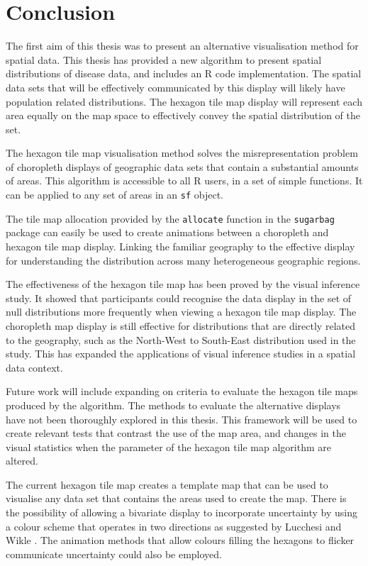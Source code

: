 \documentclass{monashthesis}
\begin{document}
\hypertarget{ch:conclusion}{%
\chapter{Conclusion}\label{ch:conclusion}}

The first aim of this thesis was to present an alternative visualisation method for spatial data. This thesis has provided a new algorithm to present spatial distributions of disease data, and includes an R code \autocite{R} implementation. The spatial data sets that will be effectively communicated by this display will likely have population related distributions. The hexagon tile map display will represent each area equally on the map space to effectively convey the spatial distribution of the set.

The hexagon tile map visualisation method solves the misrepresentation problem of choropleth displays of geographic data sets that contain a substantial amounts of areas. This algorithm is accessible to all R users, in a set of simple functions. It can be applied to any set of areas in an \texttt{sf} \autocite{sf} object.

The tile map allocation provided by the \texttt{allocate} function in the \texttt{sugarbag} package can easily be used to create animations between a choropleth and hexagon tile map display. Linking the familiar geography to the effective display for understanding the distribution across many heterogeneous geographic regions.

The effectiveness of the hexagon tile map has been proved by the visual inference study. It showed that participants could recognise the data display in the set of null distributions more frequently when viewing a hexagon tile map display. The choropleth map display is still effective for distributions that are directly related to the geography, such as the North-West to South-East distribution used in the study.
This has expanded the applications of visual inference studies in a spatial data context.

Future work will include expanding on criteria to evaluate the hexagon tile maps produced by the algorithm. The methods to evaluate the alternative displays have not been thoroughly explored in this thesis.
This framework will be used to create relevant tests that contrast the use of the map area, and changes in the visual statistics when the parameter of the hexagon tile map algorithm are altered.

The current hexagon tile map creates a template map that can be used to visualise any data set that contains the areas used to create the map.
There is the possibility of allowing a bivariate display to incorporate uncertainty by using a colour scheme that operates in two directions as suggested by Lucchesi and Wikle \autocite{VUADBC}.
The animation methods that allow colours filling the hexagons to flicker communicate uncertainty could also be employed.
\end{document}
